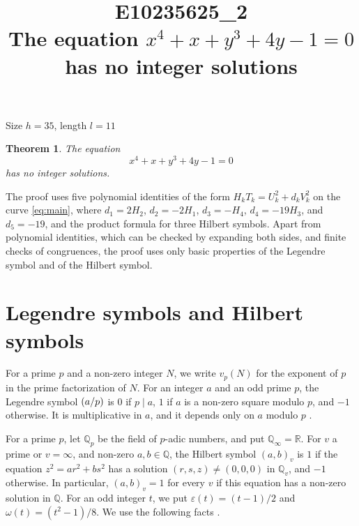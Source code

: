\documentclass[11pt]{article}
\title{\textbf{E10235625\_2}\\[4pt] {\Large The equation $x^{4}+x+y^{3}+4y-1=0$ has no integer solutions}}
\author{}
\date{}
\newtheorem{theorem}{Theorem}
\newcommand{\Q}{\mathbb{Q}}
\newcommand{\leg}[2]{\mathchoice{\biggl(\dfrac{#1}{#2}\biggr)}{(#1/#2)}{(#1/#2)}{(#1/#2)}}
\begin{document}
\maketitle
\vspace{-8ex}
\begin{center}
Size $h=35$, length $l=11$
\end{center}

\begin{theorem}\label{thm:main}
The equation
\begin{equation}\label{eq:main}
x^{4}+x+y^{3}+4y-1=0
\end{equation}
has no integer solutions.
\end{theorem}

The proof uses five polynomial identities of the form $H_kT_k=U_k^2+d_kV_k^2$ on the curve \eqref{eq:main}, where $d_{1}=2H_{2}$, $d_{2}=-2H_{1}$, $d_{3}=-H_{4}$, $d_{4}=-19H_{3}$, and $d_{5}=-19$, and the product formula for three Hilbert symbols. Apart from polynomial identities, which can be checked by expanding both sides, and finite checks of congruences, the proof uses only basic properties of the Legendre symbol and of the Hilbert symbol.

\section{Legendre symbols and Hilbert symbols}

For a prime $p$ and a non-zero integer $N$, we write $v_p(N)$ for the exponent of $p$ in the prime factorization of $N$. For an integer $a$ and an odd prime $p$, the Legendre symbol $\leg{a}{p}$ is $0$ if $p\mid a$, $1$ if $a$ is a non-zero square modulo $p$, and $-1$ otherwise. It is multiplicative in $a$, and it depends only on $a$ modulo $p$ \cite[Chapter~5]{IR}.

For a prime $p$, let $\Q_p$ be the field of $p$-adic numbers, and put $\Q_\infty=\mathbb R$. For $v$ a prime or $v=\infty$, and non-zero $a,b\in\Q$, the Hilbert symbol $(a,b)_v$ is $1$ if the equation $z^2=ar^2+bs^2$ has a solution $(r,s,z)\neq(0,0,0)$ in $\Q_v$, and $-1$ otherwise. In particular, $(a,b)_v=1$ for every $v$ if this equation has a non-zero solution in $\Q$. For an odd integer $t$, we put $\varepsilon(t)=(t-1)/2$ and $\omega(t)=(t^2-1)/8$. We use the following facts \cite[Chapter~III, Proposition~2 and Theorems~1 and~3]{Se}.
\end{document}
